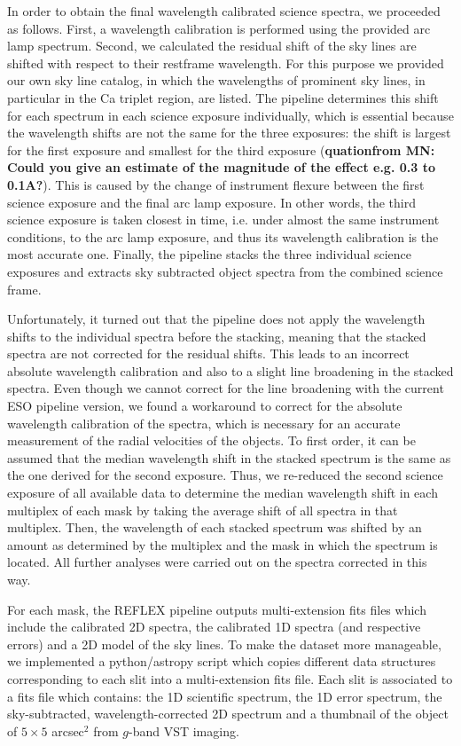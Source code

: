 \documentclass[useAMS,usenatbib]{mn2e}
\begin{document}
In order to obtain the final wavelength calibrated science spectra, we 
proceeded as follows. First, a wavelength calibration 
is performed using the provided arc lamp spectrum. Second, we calculated
the residual shift of the sky lines are shifted with respect to their restframe 
wavelength. For this purpose we provided our own sky line catalog, in which 
the wavelengths of prominent sky lines, in particular in the Ca triplet 
region, are listed. The pipeline determines this shift for each spectrum in 
each science exposure individually, which is essential because the wavelength 
shifts are not the same for the three exposures: the shift is largest for the 
first exposure and smallest for the third exposure ({\bf quationfrom MN: Could 
you give an estimate of the magnitude of the effect e.g. 0.3 to 0.1A?}). This 
is caused by the 
change of instrument flexure between the first science exposure and the final 
arc lamp exposure. In other words, the third science exposure is taken 
closest in time, i.e. under almost the same instrument conditions, to the arc 
lamp exposure, and thus its wavelength calibration is the most accurate one. 
Finally, the pipeline stacks the three individual science exposures and 
extracts sky subtracted object spectra from the combined science frame.

Unfortunately, it turned out that the pipeline does not apply the wavelength 
shifts to the individual spectra before the stacking, meaning that the stacked
spectra are not corrected for the residual shifts. This leads to an incorrect
absolute wavelength calibration and also to a slight line broadening in the 
stacked spectra. Even though we cannot correct for the line broadening with
the current ESO pipeline version, we found a workaround to correct for the
absolute wavelength calibration of the spectra, which is necessary for an 
accurate measurement of the radial velocities of the objects. To first order, 
it can be assumed that the median wavelength shift in the stacked spectrum is 
the same as the one derived for the second exposure. Thus, we re-reduced the 
second science exposure of all available data to determine the median 
wavelength shift in each multiplex of each mask by taking the average shift 
of all spectra in that multiplex. Then, the wavelength of each stacked 
spectrum was shifted by an amount as determined by the multiplex and the mask
in which the spectrum is located. All further analyses were carried out 
on the spectra corrected in this way.

For each mask, the REFLEX pipeline outputs multi-extension fits files which 
include the calibrated 2D spectra, the calibrated 1D spectra (and respective 
errors) and a 2D model of the sky lines. To make the dataset more manageable, 
we implemented a python/astropy script which copies different data structures 
corresponding to each slit into a multi-extension fits file. Each slit is 
associated to a fits file which contains: the 1D scientific spectrum, the 1D 
error spectrum, the sky-subtracted, wavelength-corrected 2D spectrum and a 
thumbnail of the object of $5\times5$ arcsec$^2$ from $g$-band VST imaging. 
\end{document}
